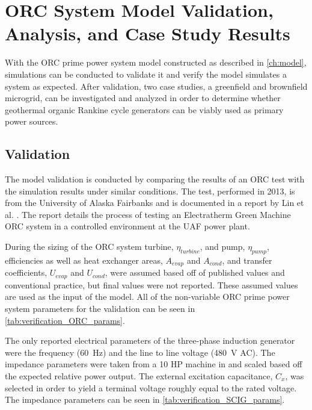 \chapter{ORC System Model Validation, Analysis, and Case Study Results}
\label{ch:analysis}

With the ORC prime power system model constructed as described in \autoref{ch:model}, simulations can be conducted to validate it and verify the model simulates a system as expected. After validation, two case studies, a greenfield and brownfield microgrid, can be investigated and analyzed in order to determine whether geothermal organic Rankine cycle generators can be viably used as primary power sources.

\section{Validation}
The model validation is conducted by comparing the results of an ORC test with the simulation results under similar conditions. The test, performed in 2013, is from the University of Alaska Fairbanks and is documented in a report by Lin et al. \cite{Lin2014}. The report details the process of testing an Electratherm Green Machine ORC system in a controlled environment at the UAF power plant.

During the sizing of the ORC system turbine, $\eta_{turbine}$, and pump, $\eta_{pump}$, efficiencies as well as heat exchanger areas, $A_{evap}$ and $A_{cond}$, and transfer coefficients, $U_{evap}$ and $U_{cond}$, were assumed based off of published values and conventional practice, but final values were not reported. These assumed values are used as the input of the model. All of the non-variable ORC prime power system parameters for the validation can be seen in \autoref{tab:verification_ORC_params}.


The only reported electrical parameters of the three-phase induction generator were the frequency (\SI{60}{\hertz}) and the line to line voltage (\SI{480}{\volt} AC). The impedance parameters were taken from a 10 HP machine in \cite{Ouazenne1983} and scaled based off the expected relative power output. The external excitation capacitance, $C_x$, was selected in order to yield a terminal voltage roughly equal to the rated voltage. The impedance parameters can be seen in \autoref{tab:verification_SCIG_params}.

%

